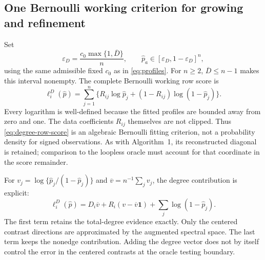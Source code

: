 \documentclass[11pt]{article}
\theoremstyle{definition}
\theoremstyle{remark}
\newcommand{\one}{\mathbf 1}
\numberwithin{equation}{section}
\begin{document}
\subsection{One Bernoulli working criterion for growing and refinement}
Set
\begin{equation}
 \varepsilon_D=\frac{c_0\max\{1,\overline D\}}n,
 \qquad
 \widehat p_a\in[\varepsilon_D,1-\varepsilon_D]^n,
 \label{eq:degree-profile-floor}
\end{equation}
using the same admissible fixed $c_0$ as in \eqref{eq:profiles}. For
$n\ge2$, $\overline D\le n-1$ makes this interval nonempty. The complete
Bernoulli working row score is
\begin{equation}
 \ell_i^D(\widehat p)
 =\sum_{j=1}^n\{R_{ij}\log\widehat p_j
             +(1-R_{ij})\log(1-\widehat p_j)\}.
 \label{eq:degree-row-score}
\end{equation}
Every logarithm is well-defined because the fitted profiles are bounded
away from zero and one. The data coefficients $R_{ij}$ themselves are not
clipped. Thus \eqref{eq:degree-row-score} is an algebraic Bernoulli fitting
criterion, not a probability density for signed observations. As with
Algorithm~1, its reconstructed diagonal is retained; comparison to the
loopless oracle must account for that coordinate in the score remainder.

For $v_j=\log\{\widehat p_j/(1-\widehat p_j)\}$ and
$\overline v=n^{-1}\sum_jv_j$, the degree contribution is explicit:
\begin{equation}
 \ell_i^D(\widehat p)
   =D_i\overline v+R_i(v-\overline v\one)
      +\sum_j\log(1-\widehat p_j).
 \label{eq:degree-contrast-decomposition}
\end{equation}
The first term retains the total-degree evidence exactly. Only the
centered contrast directions are approximated by the augmented spectral
space. The last term keeps the nonedge contribution. Adding the degree
vector does not by itself control the error in the centered contrasts at
the oracle testing boundary.
\end{document}
